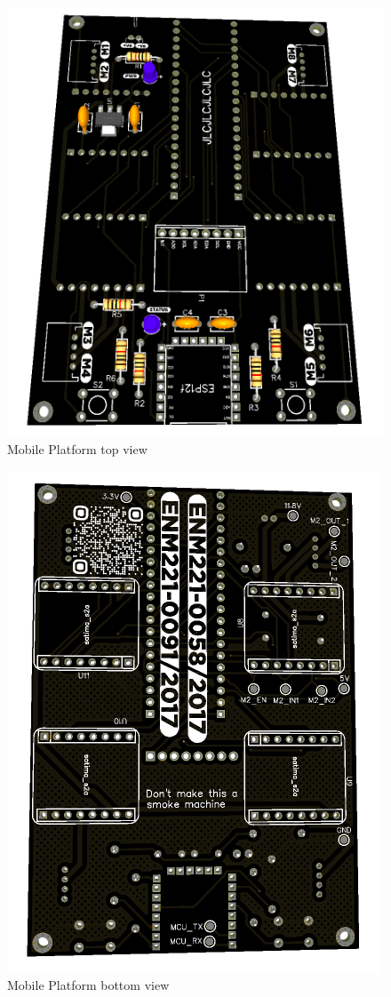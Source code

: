 \begin{figure}[H]
    \centering
    \includegraphics[scale=0.5]{Figures/MPpcb_top.png}
    \caption{Mobile Platform top view}
    \label{fig:mobileplatformtopview}
\end{figure}

\begin{figure}[H]
    \centering
    \includegraphics[scale=0.5]{Figures/MPpcb_bottom.png}
    \caption{Mobile Platform bottom view}
    \label{fig:mobileplatformbottomview}
\end{figure}

